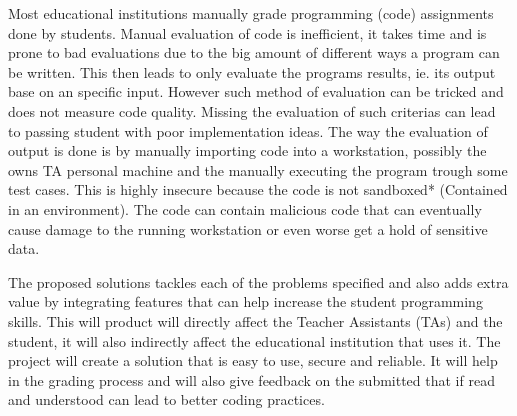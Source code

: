  Most educational institutions
manually grade programming (code) assignments done by students. Manual
evaluation of code is inefficient, it takes time and is prone to bad
evaluations due to the big amount of different ways a program can be written.
This then leads to only evaluate the programs results, ie. its output base on
an specific input. However such method of evaluation can be tricked and does
not measure code quality. Missing the evaluation of such criterias can lead to
passing student with poor implementation ideas. The way the evaluation of
output is done is by manually importing code into a workstation, possibly the
owns TA personal machine and the manually executing the program trough some
test cases. This is highly insecure because the code is not sandboxed*
(Contained in an environment). The code can contain malicious code that can
eventually cause damage to the running workstation or even worse get a hold of
sensitive data.

The proposed solutions tackles each of the problems specified and also adds
extra value by integrating features that can help increase the student
programming skills. This will product will directly affect the Teacher
Assistants (TAs) and the student, it will also indirectly affect the
educational institution that uses it. The project will create a solution that
is easy to use, secure and reliable. It will help in the grading process and
will also give feedback on the submitted that if read and understood can lead
to better coding practices.
